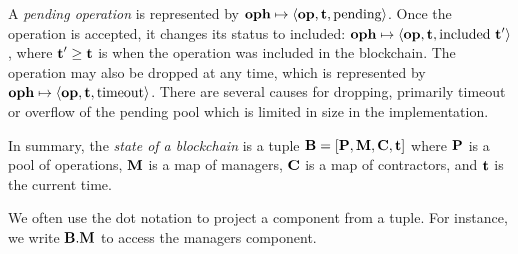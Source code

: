 \documentclass[a4paper]{llncs}
\begin{document}
A \emph{pending operation} is represented by
$\textbf{oph} \mapsto \langle  \textbf{op}, \textbf{t}, \text{pending}\rangle $.
Once the operation is accepted, it changes its status to included:
$\textbf{oph} \mapsto \langle  \textbf{op}, \textbf{t}, \text{included}\ \textbf{t}'\rangle $, where
$\textbf{t}' \ge \textbf{t}$ is  when the operation was included in the
blockchain.  The operation may also be dropped at any time, which is
represented by
$\textbf{oph} \mapsto \langle  \textbf{op}, \textbf{t}, \text{timeout}\rangle $. There are several
causes for dropping, primarily timeout or overflow of the pending
pool which is limited in size in the implementation.




In summary, the \emph{state of a blockchain} is a tuple
$\textbf{B} = [\textbf{P}, \textbf{M}, \textbf{C}, \textbf{t}]$ where
$\textbf{P}$ is a pool of operations, $\textbf{M}$ is a map of managers,
$\textbf{C}$ is a map of contractors, and $\textbf{t}$ is the current
time. 

We often use the dot notation to project a component from a tuple. For
instance, we write $\textbf{B}.\textbf{M}$ to access the managers
component. 
\end{document}
